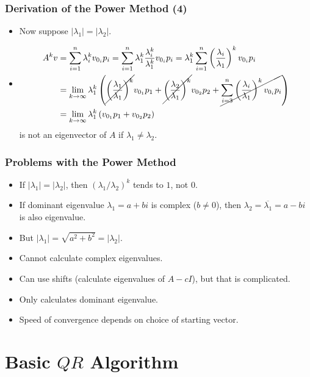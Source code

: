 \documentclass{beamer}
\begin{document}
\begin{frame}
	\frametitle{Derivation of the Power Method (4)}
	\begin{itemize}
		\item<1-> Now suppose $\left|\lambda_1\right|=\left|\lambda_2\right|$.
		\item<2->[]
		\vspace*{-\abovedisplayskip}
		\begin{align*}
			A^kv
			&=\sum_{i=1}^{n}\lambda_i^k v_{0_i} p_i
			=\sum_{i=1}^{n}\lambda_1^k\frac{\lambda_i^k}{\lambda_1^k} v_{0_i} p_i
			=\lambda_1^k \sum_{i=1}^{n}\left(\frac{\lambda_i}{\lambda_1}\right)^k v_{0_i}p_i \\
			&=\lim_{k\to\infty}\lambda_1^k \left(\cancel{\left(\frac{\lambda_1}{\lambda_1}\right)^k} v_{0_1}p_1+\cancel{\left(\frac{\lambda_2}{\lambda_1}\right)^k}v_{0_2}p_2+\cancel{\sum_{i=3}^{n}\left(\frac{\lambda_i}{\lambda_1}\right)^k v_{0_i}p_i}\right) \\
			&=\lim_{k\to\infty}\lambda_1^k\left(v_{0_1}p_1+v_{0_2}p_2\right)
		\end{align*}
		is not an eigenvector of $A$ if $\lambda_1\neq\lambda_2$.
	\end{itemize}
\end{frame}

\begin{frame}
	\frametitle{Problems with the Power Method}
	\begin{itemize}
		\item<1-> If $\left|\lambda_1\right|=\left|\lambda_2\right|$, then $(\lambda_1/\lambda_2)^k$ tends to $1$, not $0$.
		\item<2-> If dominant eigenvalue $\lambda_1=a+bi$ is complex ($b\neq0$), then $\lambda_2=\overline{\lambda_1}=a-bi$ is also eigenvalue.
		\item<3-> But $\left|\lambda_1\right|=\sqrt{a^2+b^2}=\left|\lambda_2\right|$.
		\item<4-> Cannot calculate complex eigenvalues.
		\item<5-> Can use shifts (calculate eigenvalues of $A-cI$), but that is complicated.
		\item<6-> Only calculates dominant eigenvalue.
		\item<7-> Speed of convergence depends on choice of starting vector.
	\end{itemize}
\end{frame}

\section{Basic $QR$ Algorithm}
\frame{\sectionpage}
\end{document}
